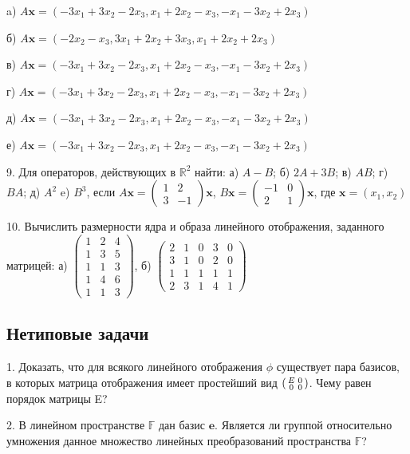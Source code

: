 \documentclass[12pt]{article}
\newenvironment{psmallmatrix}
  {\left(\begin{smallmatrix}}
  {\end{smallmatrix}\right)}
\begin{document}
a) $A\textbf{x} = (-3x_1 + 3x_2 - 2x_3, x_1 + 2x_2 - x_3, -x_1 - 3x_2 + 2x_3)$

б) $A\textbf{x} = (-2x_2-x_3, 3x_1 + 2x_2 + 3x_3, x_1 + 2x_2 + 2x_3)$

в) $A\textbf{x} = (-3x_1 + 3x_2 - 2x_3, x_1 + 2x_2 - x_3, -x_1 - 3x_2 + 2x_3)$

г) $A\textbf{x} = (-3x_1 + 3x_2 - 2x_3, x_1 + 2x_2 - x_3, -x_1 - 3x_2 + 2x_3)$

д) $A\textbf{x} = (-3x_1 + 3x_2 - 2x_3, x_1 + 2x_2 - x_3, -x_1 - 3x_2 + 2x_3)$

е) $A\textbf{x} = (-3x_1 + 3x_2 - 2x_3, x_1 + 2x_2 - x_3, -x_1 - 3x_2 + 2x_3)$

9. Для операторов, действующих в $\mathbb R^2$ найти:
а) $A-B$; б) $2A+3B$; в) $AB$; г) $BA$; д) $A^2$ e) $B^3$, если
$A\textbf{x} = \begin{pmatrix}1 & 2\\3 & -1\end{pmatrix}\textbf{x}$, $B\textbf{x} = \begin{pmatrix}-1 & 0 \\ 2 & 1\end{pmatrix}\textbf{x}$, где
$\textbf{x} = (x_1, x_2)$

10. Вычислить размерности ядра и образа линейного отображения, заданного матрицей:
а) $\begin{pmatrix}
1 &2 &4\\
1 &3 &5\\
1 &1 &3\\
1 &4 &6\\
1 &1 &3
\end{pmatrix}$, 
б) $\begin{pmatrix}
2 & 1 & 0 & 3 & 0\\
3 & 1 & 0 & 2 & 0\\
1 & 1 & 1 & 1 & 1\\
2 & 3 & 1 & 4 & 1
\end{pmatrix}$
\subsection*{Нетиповые задачи}	
1. Доказать, что для всякого линейного отображения $\phi$ существует пара базисов, в которых матрица отображения имеет простейший вид $\begin{psmallmatrix} E & 0\\0 & 0 \end{psmallmatrix}$. Чему равен порядок матрицы E?

2. В линейном пространстве $\mathbb F$ дан базис $\textbf{e}$. Является ли группой относительно умножения данное множество линейных преобразований пространства $\mathbb F$?
\end{document}

